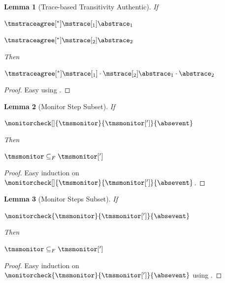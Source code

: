 \documentclass[a4paper,names,dvipsnames]{article}
\newtheorem{lemma}{Lemma}
\begin{document}
\begin{lemma}[Trace-based Transitivity Authentic]\label{lem:trace-agree-trans}
  If
  \begin{assumptions}
    \item $\tmstraceagree[^{*}]{\mstrace[_{1}]}{\abstrace_{1}}$
    \item $\tmstraceagree[^{*}]{\mstrace[_{2}]}{\abstrace_{2}}$
  \end{assumptions}
  Then
  \begin{goals}
    \item $\tmstraceagree[^{*}]{\mstrace[_{1}]\cdot\mstrace[_{2}]}{\abstrace_{1}\cdot\abstrace_{2}}$
  \end{goals}
\end{lemma}
\begin{proof}
  Easy using .
\end{proof}

\begin{lemma}[Monitor Step Subset]\label{lem:monitor-step-subset}
  If
  \begin{assumptions}
    \item $\monitorcheck[]{\tmsmonitor}{\tmsmonitor[']}{\absevent}$
  \end{assumptions}
  Then
  \begin{goals}
    \item $\tmsmonitor\subseteq_F \tmsmonitor[']$
  \end{goals}
\end{lemma}
\begin{proof}
  Easy induction on $\monitorcheck[]{\tmsmonitor}{\tmsmonitor[']}{\absevent}$.
\end{proof}

\begin{lemma}[Monitor Steps Subset]\label{lem:monitor-steps-subset}
  If
  \begin{assumptions}
    \item $\monitorcheck{\tmsmonitor}{\tmsmonitor[']}{\absevent}$
  \end{assumptions}
  Then
  \begin{goals}
    \item $\tmsmonitor\subseteq_F \tmsmonitor[']$
  \end{goals}
\end{lemma}
\begin{proof}
  Easy induction on $\monitorcheck{\tmsmonitor}{\tmsmonitor[']}{\absevent}$ using .
\end{proof}
\end{document}

